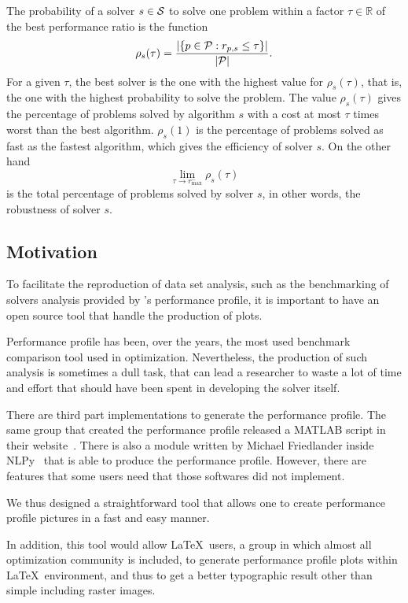     The probability of a solver $s \in \mathcal{S}$  to solve one problem within a
    factor $\tau \in \mathds{R}$ of the best performance ratio is the function
    \begin{align*}
      \rho_s(\tau) = \frac{| \{p \in \mathcal{P}: r_{p,s} \leq \tau\} |}{| \mathcal{P} |}.
    \end{align*}
    For a given $\tau$, the best solver is the one with the highest value for
    $\rho_s(\tau)$, that is, the one with the highest probability to solve the
    problem.
    The value $\rho_s(\tau)$ gives the percentage of problems solved by
    algorithm $s$ with a cost at most $\tau$ times worst than the best
    algorithm. $\rho_s(1)$ is the percentage of problems solved as fast as the
    fastest algorithm, which gives the efficiency of solver $s$.
    On the other hand
    \[\displaystyle \lim_{\tau\rightarrow r^-_{\max}} \rho_s(\tau)\]
    is the total percentage of problems solved by solver $s$, in
    other words, the robustness of solver $s$.

\subsection*{Motivation}

    To facilitate the reproduction of data set analysis, such as the
    benchmarking of solvers analysis provided by \citeauthor{Dolan:2002du}'s
    performance profile, it is important to have an open source tool that handle
    the production of plots.

    Performance profile has been, over the years, the most used benchmark
    comparison tool used in optimization. Nevertheless, the production of such
    analysis is sometimes a dull task, that can lead a researcher to waste a lot
    of time and effort that should have been spent in developing the solver
    itself.

    There are third part implementations to generate the performance profile.
    The same group that created the performance profile released a MATLAB
    script in their website~\cite{url:cops}. There is also a module written by
    Michael Friedlander inside
    NLPy~\cite{url:NLPy} that is able to produce the performance profile.
    However, there are features that some users need that those softwares did
    not implement.

    We thus designed a straightforward tool that allows one to create
    performance profile pictures in a fast and easy manner.

    In addition, this tool would allow \LaTeX\ users, a group in which almost
    all optimization community is included, to generate performance profile
    plots within \LaTeX\ environment, and thus to get a better typographic
    result other than simple including raster  images.

